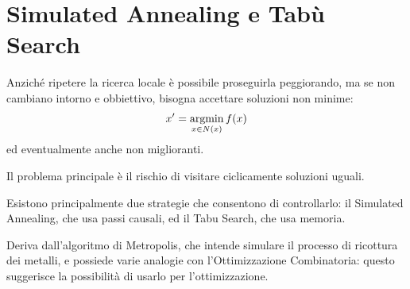 \documentclass[\main/main.tex]{subfiles}
\begin{document}
\chapter{Simulated Annealing e Tabù Search}
\begin{multicols}{2}
\begin{observation}
    Anziché ripetere la ricerca locale è possibile proseguirla peggiorando, ma se non cambiano intorno e obbiettivo, bisogna accettare soluzioni non minime:
    \[
        x' = \operatorname*{argmin}_{x \in N(x)} f(x)
    \]
    ed eventualmente anche non miglioranti.
    
    Il problema principale è il rischio di visitare ciclicamente soluzioni uguali.
    
    Esistono principalmente due strategie che consentono di controllarlo: il Simulated Annealing, che usa passi causali, ed il Tabu Search, che usa memoria.
\end{observation}
\begin{definition}
    Deriva dall'algoritmo di Metropolis, che intende simulare il processo di ricottura dei metalli, e possiede varie analogie con l'Ottimizzazione Combinatoria: questo suggerisce la possibilità di usarlo per l'ottimizzazione.


\end{definition}
\end{multicols}
\end{document}
